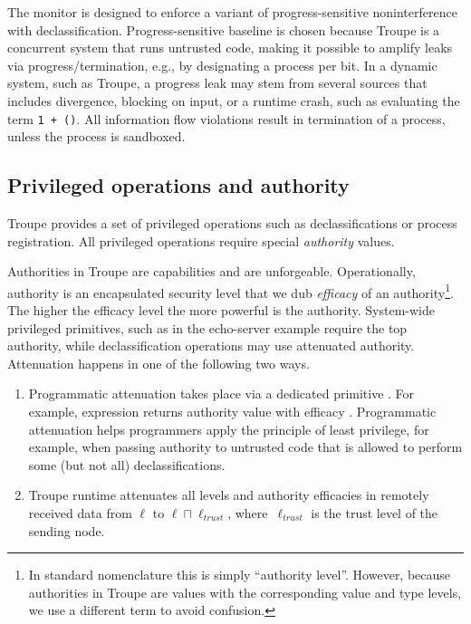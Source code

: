 The monitor is designed to enforce a variant of progress-sen\-si\-tive 
noninterference with declassification. Progress-sensitive baseline is chosen because Troupe is a concurrent system that runs untrusted code, making it possible to amplify leaks via progress/termination, e.g., by designating a process per bit. 
%
In a dynamic system, such as Troupe, a progress leak may stem from several sources that includes divergence, blocking on input, or a runtime crash, such as evaluating the term {\tt 1 + ()}. 
%
%
All information flow violations result in termination of a process,
unless the process is sandboxed. 





\subsection{Privileged operations and authority}
\label{sec:infoflow:authority}

Troupe provides a set of privileged operations 
such as declassifications or process registration. All privileged operations require special \emph{authority} values. 

Authorities in Troupe are capabilities and are unforgeable. 
Operationally, authority is an encapsulated security level that we dub  \emph{efficacy} of an authority\footnote{In standard nomenclature this is simply ``authority level''. However, because authorities in Troupe are values with the corresponding value and type levels, we use a different term to avoid confusion.}. The higher the efficacy level the more powerful is the authority. 
%
System-wide privileged primitives, such as  in the echo-server example require the top authority, while  declassification operations may use attenuated authority. Attenuation happens in one of the following two ways. 
\label{sec:io:check}

\begin{enumerate}
\item 
Programmatic attenuation takes place via a dedicated primitive . For example, expression  returns authority value with efficacy .  Programmatic attenuation helps programmers apply the principle of least privilege, for example, when passing authority to untrusted code that is allowed to perform some (but not all) declassifications.

\item Troupe runtime attenuates all levels and authority efficacies in remotely received data from $\ell$ to $\ell \sqcap \ell_{\mathit{trust}}$, where~$\ell_{\mathit{trust}}$ is the trust level of the sending node.
\end{enumerate}





